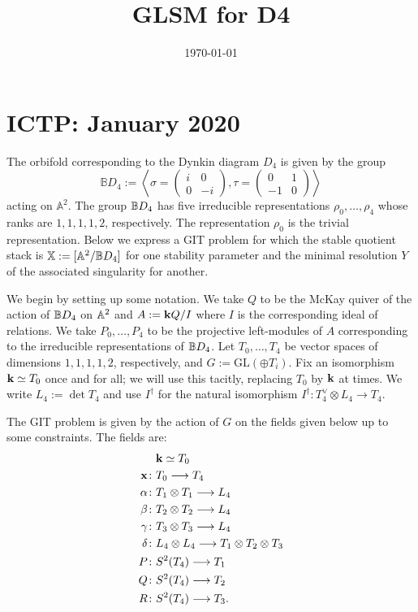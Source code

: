\documentclass{amsart}
\title{GLSM for D4}
\date{\today}
\theoremstyle{definition}
\begin{document}
\maketitle

\section{ICTP: January 2020}

The orbifold corresponding to the Dynkin diagram $D_4$ is given by the group 
\[
\mathbb{B}D_4:= \left\langle \sigma=\left(\begin{array}{cc} i & 0 \\ 0 & -i \end{array} \right), \tau=\left( \begin{array}{cc} 0 & 1 \\ -1 & 0 \end{array} \right) \right\rangle
\]
acting on $\mathbb{A}^2$.
The group $\mathbb{B} D_4$ has five irreducible representations $\rho_0, \ldots, \rho_4$ whose ranks are $1,1,1,1,2$, respectively. The representation $\rho_0$ is the trivial representation.
Below we express a GIT problem for which the stable quotient stack is $\mathbb{X}:= [\mathbb{A}^2/ \mathbb{B} D_4]$ for one stability parameter and the minimal resolution $Y$ of the associated singularity for another.

We begin by setting up some notation.
We take $Q$ to be the McKay quiver of the action of $\mathbb{B} D_4$ on $\mathbb{A}^2$ and $A:= \mathbf{k} Q/I$ where $I$ is the corresponding ideal of relations.
We take $P_0, \ldots, P_4$ to be the projective left-modules of $A$ corresponding to the irreducible representations of $\mathbb{B} D_4$.
Let $T_0, \ldots, T_4$ be vector spaces of dimensions $1,1,1,1,2$, respectively, and $G:= \text{GL}(\oplus T_i)$.
Fix an isomorphism $\mathbf{k} \simeq T_0$ once and for all; we will use this tacitly, replacing $T_0$ by $\mathbf{k}$ at times.
We write $L_4:= \det T_4$ and use $I^\dagger$ for the natural isomorphism $I^\dagger \colon T_4^\vee \otimes L_4 \rightarrow T_4$.

The GIT problem is given by the action of $G$ on the fields given below up to some constraints.
The fields are:
\begin{align}
&\mathbf{k} \simeq T_0 \\
\mathbf{x} \colon &T_0 \longrightarrow T_4 \label{fd:x} \\
\alpha \colon &T_1 \otimes T_1 \longrightarrow L_4 \label{fd:alpha} \\
\beta \colon &T_2 \otimes T_2 \longrightarrow L_4 \label{fd:beta} \\
\gamma \colon &T_3 \otimes T_3 \longrightarrow L_4 \label{fd:gamma} \\
\delta \colon &L_4 \otimes L_4 \longrightarrow T_1 \otimes T_2 \otimes T_3 \label{fd:delta} \\
P \colon &S^2(T_4) \longrightarrow T_1 \label{fd:P} \\ 
Q \colon &S^2(T_4) \longrightarrow T_2 \label{fd:Q} \\
R \colon &S^2(T_4) \longrightarrow T_3. \label{fd:R}
\end{align}
\end{document}
